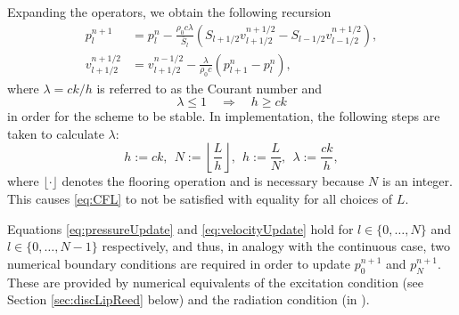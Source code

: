 Expanding the operators, we obtain the following recursion
\begin{subequations}\label{eq:updateNormal}
    \begin{align}
        p_l^{n+1} &= p_l^n - \frac{\rho_0 c \lambda}{\bar{S}_l}(S_{l+1/2}v_{l+1/2}^{n+1/2}-S_{l-1/2}v_{l-1/2}^{n+1/2}),\label{eq:pressureUpdate}\\
        v_{l+1/2}^{n+1/2} &= v_{l+1/2}^{n-1/2}-\frac{\lambda}{\rho_0 c}(p_{l+1}^n - p_l^n),\label{eq:velocityUpdate}
    \end{align}
\end{subequations}
where $\lambda = ck/h$ is referred to as the Courant number and \cite{bilbao2009}
\begin{equation}\label{eq:CFL}
    \lambda \leq 1 \quad\Longrightarrow \quad  h\geq ck
\end{equation}
in order for the scheme to be stable. In implementation, the following steps are taken to calculate $\lambda$:
\begin{equation}\label{eq:orderOfCalcGrid}
    h := ck,\ \ N := \left\lfloor\frac{L}{h}\right\rfloor, \ \ h := \frac{L}{N}, \ \ \lambda := \frac{ck}{h},
\end{equation}
where $\lfloor \cdot \rfloor$ denotes the flooring operation and is necessary because $N$ is an integer. This causes \eqref{eq:CFL} to not be satisfied with equality for all choices of $L$.

Equations \eqref{eq:pressureUpdate} and \eqref{eq:velocityUpdate} hold for $l\in \{0,\hdots,N\}$ and $l\in\{0,\hdots,N-1\}$ respectively, and thus, in analogy with the continuous case, two numerical boundary conditions are required in order to update $p_{0}^{n+1}$ and $p_{N}^{n+1}$. These are provided by numerical equivalents of the excitation condition (see Section \ref{sec:discLipReed} below) and the radiation condition (in \cite{Harrison2018}).

